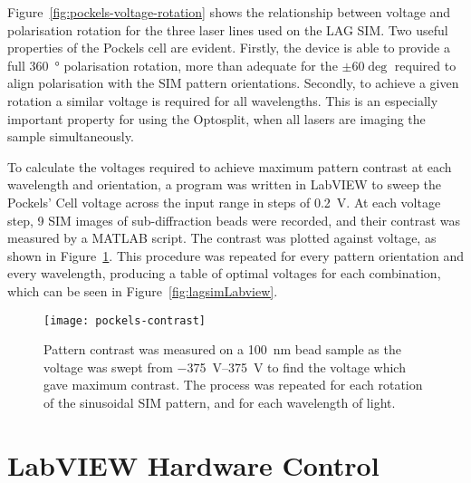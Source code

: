 Figure~\ref{fig:pockels-voltage-rotation} shows the relationship between voltage and polarisation rotation for the three laser lines used on the LAG SIM. 
Two useful properties of the Pockels cell are evident. 
Firstly, the device is able to provide a full \SI{360}{\degree} polarisation rotation, more than adequate for the $\pm60\deg$ required to align polarisation with the SIM pattern orientations. 
Secondly, to achieve a given rotation a similar voltage is required for all wavelengths. 
This is an especially important property for using the Optosplit, when all lasers are imaging the sample simultaneously. 

To calculate the voltages required to achieve maximum pattern contrast at each wavelength and orientation, a program was written in LabVIEW to sweep the Pockels' Cell voltage across the input range in steps of \SI{0.2}{\volt}. 
At each voltage step, 9 SIM images of sub-diffraction beads were recorded, and their contrast was measured by a MATLAB script. 
The contrast was plotted against voltage, as shown in Figure~\ref{fig:pockels-contrast}.
This procedure was repeated for every pattern orientation and every wavelength, producing a table of optimal voltages for each combination, which can be seen in Figure~\ref{fig:lagsimLabview}. 

\begin{figure}[htbp!]
\centering
\texttt{[image: pockels-contrast]}
\caption[LAG SIM: Measurements of a bead sample reveal the ideal Pockels cell voltages for maximum pattern contrast]{Pattern contrast was measured on a \SI{100}{\nano\metre} bead sample as the voltage was swept from \SIrange{-375}{375}{\volt} to find the voltage which gave maximum contrast. The process was repeated for each rotation of the sinusoidal SIM pattern, and for each wavelength of light. }
\label{fig:pockels-contrast}
\end{figure}






\section{LabVIEW Hardware Control} \label{sec:labview}

